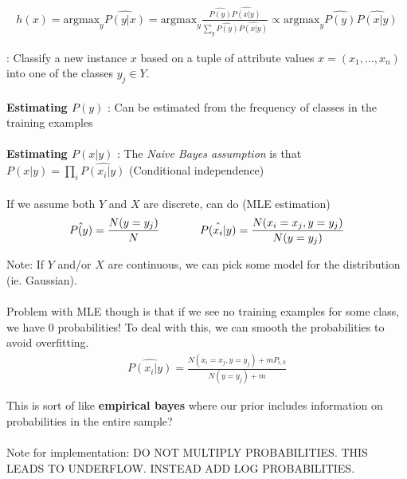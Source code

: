 \documentclass[a4paper]{article}\usepackage[]{graphicx}\usepackage[]{color}
\begin{document}
\begin{align*}
h(x) = \text{argmax}_y \hat{P(y|x)}  = \text{argmax}_y \frac{\hat{P(y)}\hat{P(x|y)}}{\sum_y \hat{P(y)}\hat{P(x|y)}} \propto \text{argmax}_y \hat{P(y)}\hat{P(x|y)}
\end{align*}

: Classify a new instance $x$ based on a tuple of attribute values $x=(x_1,\ldots,x_n)$ into one of the classes $y_j \in Y$. \\
\\

\textbf{Estimating $P(y)$} : Can be estimated from the frequency of classes in the training examples\\
\\
\textbf{Estimating $P(x|y)$} : The \emph{Naive Bayes assumption} is that $P(x|y) = \prod_i \hat{P(x_i|y)}$ (Conditional independence) \\
\\

If we assume both $Y$ and $X$ are discrete, can do (MLE estimation)
\begin{align*}
\hat{P(y)} = \frac{N(y=y_j)}{N} \hspace{0.5in} \hat{P(x_i|y)} = \frac{N(x_i=x_j,y=y_j)}{N(y=y_j)}
\end{align*}

Note: If $Y$ and/or $X$ are continuous, we can pick some model for the distribution (ie. Gaussian). \\
\\

Problem with MLE though is that if we see no training examples for some class, we have 0 probabilities! To deal with this, we can smooth the probabilities to avoid overfitting. 
\begin{align*}
\hat{P(x_i|y)} = \frac{N(x_i=x_j,y=y_j)+mP_{i,k}}{N(y=y_j)+m}
\end{align*}

This is sort of like \textbf{empirical bayes} where our prior includes information on probabilities in the entire sample?  \\
\\
Note for implementation: DO NOT MULTIPLY PROBABILITIES. THIS LEADS TO UNDERFLOW. INSTEAD ADD LOG PROBABILITIES.
\end{document}
